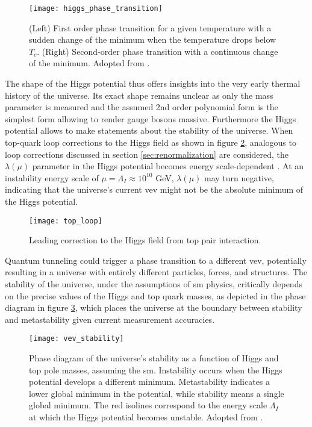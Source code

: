 \begin{figure}
    \centering
    \texttt{[image: higgs\_phase\_transition]}
    \caption[]{(Left) First order phase transition for a given temperature with a sudden change of the minimum when the temperature drops below $T_c$. (Right) Second-order phase transition with a continuous change of the minimum. Adopted from \citep{Banerjee2011ElectroweakPT}.}
    \label{fig:higgs_phase_transition}
\end{figure}

The shape of the Higgs potential thus offers insights into the very early thermal history of the universe. Its exact shape remains unclear as only the mass parameter is measured and the assumed 2nd order polynomial form is the simplest form allowing to render gauge bosons massive. Furthermore the Higgs potential allows to make statements about the stability of the universe. When top-quark loop corrections to the Higgs field as shown in figure \ref{fig:top_loop}, analogous to loop corrections discussed in section \ref{sec:renormalization} are considered, the $\lambda(\mu)$ parameter in the Higgs potential becomes energy scale-dependent \citep{devoto2022false}. At an instability energy scale of $\mu=\Lambda_I \approx 10^{10}$ GeV, $\lambda(\mu)$ may turn negative, indicating that the universe's current \ac{vev} might not be the absolute minimum of the Higgs potential.

\begin{figure}
    \centering
    \texttt{[image: top\_loop]}
    \caption[]{Leading correction to the Higgs field from top pair interaction.}
    \label{fig:top_loop}
\end{figure}

Quantum tunneling could trigger a phase transition to a different \ac{vev}, potentially resulting in a universe with entirely different particles, forces, and structures. The stability of the universe, under the assumptions of \ac{sm} physics, critically depends on the precise values of the Higgs and top quark masses, as depicted in the phase diagram in figure \ref{fig:vev_stability}, which places the universe at the boundary between stability and metastability given current measurement accuracies.

\begin{figure}
    \centering
    \texttt{[image: vev\_stability]}
    \caption[]{Phase diagram of the universe's stability as a function of Higgs and top pole masses, assuming the \ac{sm}. Instability occurs when the Higgs potential develops a different minimum. Metastability indicates a lower global minimum in the potential, while stability means a single global minimum. The red isolines correspond to the energy scale $\Lambda_I$ at which the Higgs potential becomes unstable. Adopted from \citep{Buttazzo:2013uya}.}
    \label{fig:vev_stability}
\end{figure}

